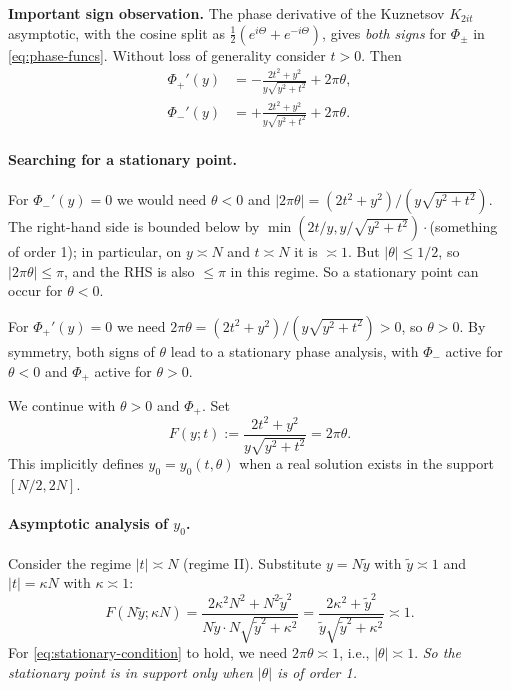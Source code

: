 \documentclass[11pt]{article}
\theoremstyle{definition}
\begin{document}
\textbf{Important sign observation.} The phase derivative of the Kuznetsov $K_{2it}$ asymptotic, with the cosine split as $\frac{1}{2}(e^{i\Theta}+e^{-i\Theta})$, gives \emph{both signs} for $\Phi_\pm$ in \eqref{eq:phase-funcs}. Without loss of generality consider $t > 0$. Then
\begin{align}
   \Phi_+'(y) &= -\frac{2t^2+y^2}{y\sqrt{y^2+t^2}} + 2\pi\theta, \label{eq:phase-plus-prime}\\
   \Phi_-'(y) &= +\frac{2t^2+y^2}{y\sqrt{y^2+t^2}} + 2\pi\theta. \label{eq:phase-minus-prime}
\end{align}

\paragraph{Searching for a stationary point.}
For $\Phi_-'(y) = 0$ we would need $\theta < 0$ and $|2\pi\theta| = (2t^2+y^2)/(y\sqrt{y^2+t^2})$. The right-hand side is bounded below by $\min(2t/y, y/\sqrt{y^2+t^2})\cdot$(something of order 1); in particular, on $y \asymp N$ and $t \asymp N$ it is $\asymp 1$. But $|\theta| \le 1/2$, so $|2\pi\theta| \le \pi$, and the RHS is also $\le \pi$ in this regime. So a stationary point can occur for $\theta < 0$.

For $\Phi_+'(y) = 0$ we need $2\pi\theta = (2t^2+y^2)/(y\sqrt{y^2+t^2}) > 0$, so $\theta > 0$. By symmetry, both signs of $\theta$ lead to a stationary phase analysis, with $\Phi_-$ active for $\theta < 0$ and $\Phi_+$ active for $\theta > 0$.

We continue with $\theta > 0$ and $\Phi_+$. Set
\begin{equation}\label{eq:stationary-condition}
    F(y;t) := \frac{2t^2+y^2}{y\sqrt{y^2+t^2}} = 2\pi\theta.
\end{equation}
This implicitly defines $y_0 = y_0(t,\theta)$ when a real solution exists in the support $[N/2,2N]$.

\paragraph{Asymptotic analysis of $y_0$.}
Consider the regime $|t| \asymp N$ (regime II). Substitute $y = N \tilde y$ with $\tilde y \asymp 1$ and $|t| = \kappa N$ with $\kappa \asymp 1$:
\[
    F(N\tilde y; \kappa N) = \frac{2\kappa^2 N^2 + N^2\tilde y^2}{N\tilde y \cdot N\sqrt{\tilde y^2+\kappa^2}} = \frac{2\kappa^2+\tilde y^2}{\tilde y\sqrt{\tilde y^2+\kappa^2}} \asymp 1.
\]
For \eqref{eq:stationary-condition} to hold, we need $2\pi\theta \asymp 1$, i.e., $|\theta| \asymp 1$. \emph{So the stationary point is in support only when $|\theta|$ is of order 1.}
\end{document}
